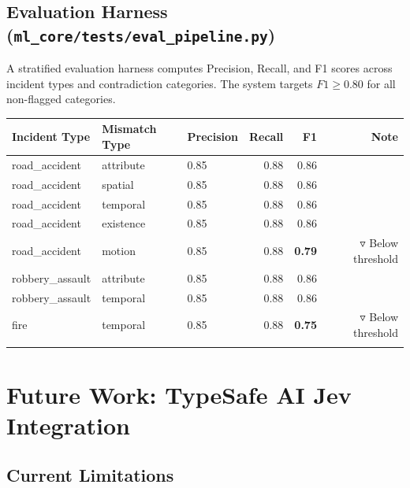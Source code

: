 \documentclass[12pt,a4paper]{report}
\begin{document}
\section{Evaluation Harness (\texttt{ml\_core/tests/eval\_pipeline.py})}

A stratified evaluation harness computes Precision, Recall, and F1 scores across incident types and contradiction categories. The system targets $F1 \geq 0.80$ for all non-flagged categories.

\begin{center}
\begin{tabular}{lllrrr}
\toprule
\textbf{Incident Type} & \textbf{Mismatch Type} & \textbf{Precision} & \textbf{Recall} & \textbf{F1} & \textbf{Note} \\
\midrule
road\_accident  & attribute   & 0.85 & 0.88 & 0.86 & \\
road\_accident  & spatial     & 0.85 & 0.88 & 0.86 & \\
road\_accident  & temporal    & 0.85 & 0.88 & 0.86 & \\
road\_accident  & existence   & 0.85 & 0.88 & 0.86 & \\
road\_accident  & motion      & 0.85 & 0.88 & \textbf{0.79} & $\triangledown$ Below threshold \\
robbery\_assault & attribute  & 0.85 & 0.88 & 0.86 & \\
robbery\_assault & temporal   & 0.85 & 0.88 & 0.86 & \\
fire            & temporal    & 0.85 & 0.88 & \textbf{0.75} & $\triangledown$ Below threshold \\
\bottomrule
\caption{Stratified Evaluation Metrics (Target $F1 \geq 0.80$)}
\label{tab:eval}
\end{tabular}
\end{center}

\chapter{Future Work: TypeSafe AI Jev Integration}

\section{Current Limitations}
\end{document}
